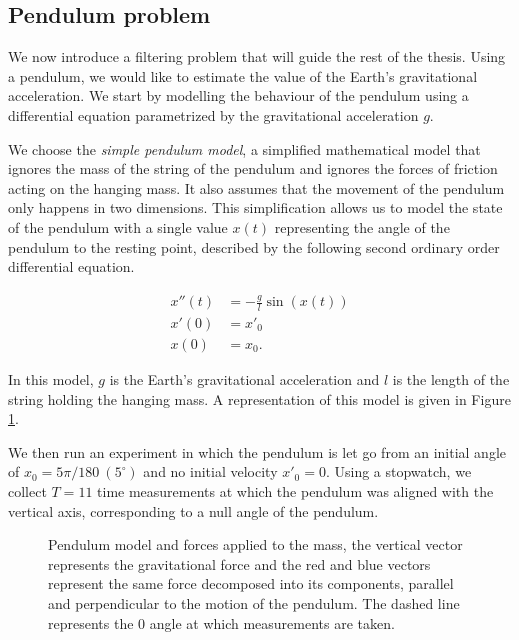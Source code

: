 \subsection{Pendulum problem}

We now introduce a filtering problem that will guide the rest of the thesis. Using a pendulum, we would like to estimate the value of the Earth's gravitational acceleration. We start by modelling the behaviour of the pendulum using a differential equation parametrized by the gravitational acceleration $g$.

We choose the \textit{simple pendulum model}, a simplified mathematical model that ignores the mass of the string of the pendulum and ignores the forces of friction acting on the hanging mass. It also assumes that the movement of the pendulum only happens in two dimensions. This simplification allows us to model the state of the pendulum with a single value $x(t)$ representing the angle of the pendulum to the resting point, described by the following second ordinary order differential equation.

\begin{equation}\label{pendulum-ode}
  \begin{aligned}
  x''(t) &= -\frac{g}{l}\sin(x(t))\\
  x'(0) &= x'_0\\
  x(0) &= x_0.
  \end{aligned}
\end{equation}

In this model, $g$ is the Earth's gravitational acceleration and $l$ is the length of the string holding the hanging mass. A representation of this model is given in Figure \ref{pendulum-fig}.

We then run an experiment in which the pendulum is let go from an initial angle of $x_0 = 5\pi/180\ (5^\circ)$ and no initial velocity $x'_0 = 0$. Using a stopwatch, we collect $T=11$ time measurements at which the pendulum was aligned with the vertical axis, corresponding to a null angle of the pendulum.

\begin{figure}
  \centering
  
  \caption{Pendulum model and forces applied to the mass, the vertical vector represents the gravitational force and the red and blue vectors represent the same force decomposed into its components, parallel and perpendicular to the motion of the pendulum. The dashed line represents the $0$ angle at which measurements are taken.}
  \label{pendulum-fig}
\end{figure}

